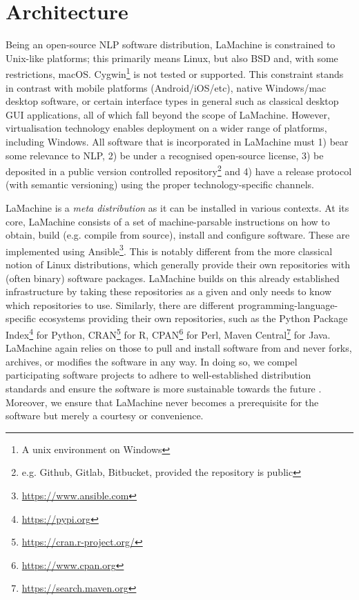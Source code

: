 \documentclass[a4paper,11pt]{article}
\begin{document}
\section{Architecture}

Being an open-source NLP software distribution, LaMachine is constrained to Unix-like platforms; this primarily means
Linux, but also BSD and, with some restrictions, macOS. Cygwin\footnote{A unix environment on Windows} is not tested or
supported. This constraint stands in contrast with mobile platforms (Android/iOS/etc), native Windows/mac desktop
software, or certain interface types in general such as classical desktop GUI applications, all of which fall beyond the
scope of LaMachine. However, virtualisation technology enables deployment on a wider range of platforms, including
Windows.  All software that is incorporated in LaMachine must 1) bear some relevance to NLP, 2) be under a recognised
open-source license, 3) be deposited in a public version controlled repository\footnote{e.g. Github, Gitlab, Bitbucket,
provided the repository is public} and 4) have a release protocol (with semantic versioning) using the proper
technology-specific channels.

LaMachine is a \emph{meta distribution} as it can be installed in various contexts. At its core, LaMachine consists of a
set of machine-parsable instructions on how to obtain, build (e.g. compile from source), install and configure software.
These are implemented using Ansible\footnote{\url{https://www.ansible.com}}.  This is notably different from the more
classical notion of Linux distributions, which generally provide their own repositories with (often binary) software
packages. LaMachine builds on this already established infrastructure by taking these repositories as a given and only
needs to know which repositories to use.  Similarly, there are different programming-language-specific ecosystems
providing their own repositories, such as the Python Package Index\footnote{\url{https://pypi.org}} for Python,
CRAN\footnote{\url{https://cran.r-project.org/}} for R, CPAN\footnote{\url{https://www.cpan.org}} for Perl, Maven
Central\footnote{\url{https://search.maven.org}} for Java.  LaMachine again relies on those to pull and install software
from and never forks, archives, or modifies the software in any way. In doing so, we compel participating software
projects to adhere to well-established distribution standards and ensure the software is more sustainable towards the
future \cite{softwarequality}. Moreover, we ensure that LaMachine never becomes a prerequisite for the software but
merely a courtesy or convenience.
\end{document}
